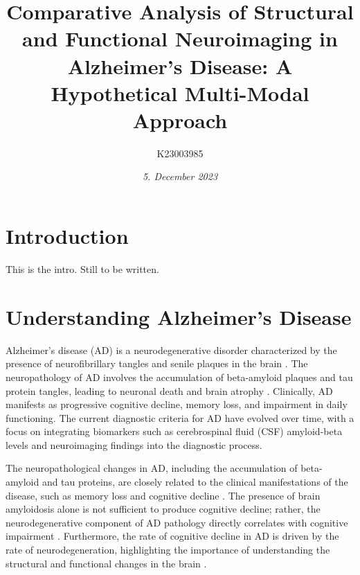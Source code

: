 \documentclass[10pt]{article}
\title{\textbf{Comparative Analysis of Structural and Functional Neuroimaging in Alzheimer's Disease: }A Hypothetical Multi-Modal Approach}
\author[ ]{K23003985}
\date{\textit{5. December 2023}}
\begin{document}

\maketitle

\doublespacing

\begin{sloppypar} %





  \section{Introduction}
  \label{sec:introduction}

  This is the intro. Still to be written.

  \section{Understanding Alzheimer's Disease}
  \label{sec:alzheimers-disease}

  Alzheimer's disease (AD) is a neurodegenerative disorder characterized by the presence of neurofibrillary tangles and senile plaques in the brain \citep{petersen_alzheimers_2009}. The neuropathology of AD involves the accumulation of beta-amyloid plaques and tau protein tangles, leading to neuronal death and brain atrophy \citep{petersen_alzheimers_2009}. Clinically, AD manifests as progressive cognitive decline, memory loss, and impairment in daily functioning. The current diagnostic criteria for AD have evolved over time, with a focus on integrating biomarkers such as cerebrospinal fluid (CSF) amyloid-beta levels and neuroimaging findings into the diagnostic process.

  The neuropathological changes in AD, including the accumulation of beta-amyloid and tau proteins, are closely related to the clinical manifestations of the disease, such as memory loss and cognitive decline \citep{jack_serial_2009}. The presence of brain amyloidosis alone is not sufficient to produce cognitive decline; rather, the neurodegenerative component of AD pathology directly correlates with cognitive impairment \citep{jack_serial_2009}. Furthermore, the rate of cognitive decline in AD is driven by the rate of neurodegeneration, highlighting the importance of understanding the structural and functional changes in the brain \citep{jack_serial_2009}.


\end{sloppypar}
\end{document}
